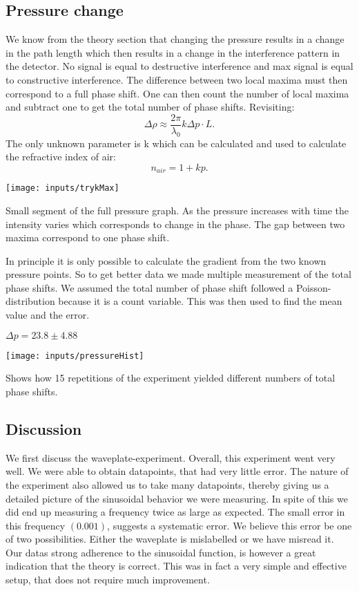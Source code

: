 \documentclass[working, oneside]{inputs/tuftebook}
\begin{document}
\subsection*{Pressure change} 
We know from the theory section that changing the pressure results in a change in the path length which then results in a change in the interference pattern in the detector. No signal is equal to destructive interference and max signal is equal to constructive interference. The difference between two local maxima must then correspond to a full phase shift. One can then count the number of local maxima and subtract one to get the total number of phase shifts. Revisiting:
\[
\Delta \rho \approx \frac{2\pi}{\lambda_0}k\Delta p\cdot L
.\] 
The only unknown parameter is k which can be calculated and used to calculate the refractive index of air:
\[
n_{air} = 1 + k p
.\] 
\begin{marginfigure}
	\centering
	\texttt{[image: inputs/trykMax]}
	\caption{Small segment of the full pressure graph. As the pressure increases with time the intensity varies which corresponds to change in the phase. The gap between two maxima correspond to one phase shift.}
\end{marginfigure}
In principle it is only possible to calculate the gradient from the two known pressure points. So to get better data we made multiple measurement of the total phase shifts. We assumed the total number of phase shift followed a Poisson-distribution because it is a count variable. This was then used to find the mean value and the error. 
\begin{center}
$\Delta p = 23.8 \pm 4.88$
\end{center}

\begin{marginfigure}
	\centering
	\texttt{[image: inputs/pressureHist]}
	\caption{Shows how 15 repetitions of the experiment yielded different numbers of total phase shifts. }
\end{marginfigure}

\subsection*{Discussion}
We first discuss the waveplate-experiment. Overall, this experiment went very well. We were able to obtain datapoints, that had very little error. The nature of the experiment also allowed us to take many datapoints, thereby giving us a detailed picture of the sinusoidal behavior we were measuring. In spite of this we did end up measuring a frequency twice as large as expected. The small error in this frequency $(0.001)$, suggests a systematic error. We believe this error be one of two possibilities. Either the waveplate is mislabelled or we have misread it. Our datas strong adherence to the sinusoidal function, is however a great indication that the theory is correct. This was in fact a very simple and effective setup, that does not require much improvement.
\end{document}
